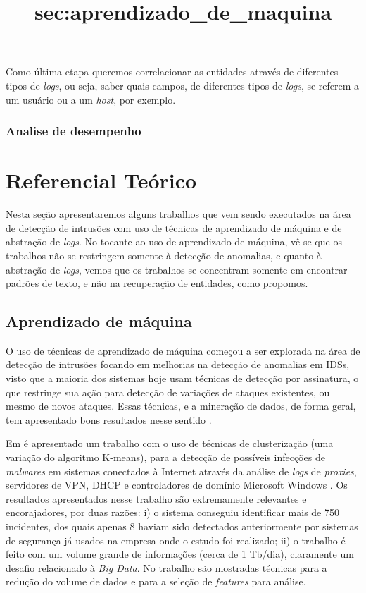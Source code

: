\documentclass[
	12pt,				%
	openright,			%
	twoside,			%
	a4paper,			%
	english,			%
	french,				%
	spanish,			%
	brazil,				%
	]{abntex2}
\begin{document}
Como última etapa queremos correlacionar as entidades através de diferentes tipos de \emph{logs}, ou seja, saber quais campos, de diferentes tipos de \emph{logs}, se referem a um usuário ou a um \emph{host}, por exemplo.

\subsection{Analise de desempenho}

\chapter{Referencial Teórico}\label{chap:referencial}

Nesta seção apresentaremos alguns trabalhos que vem sendo executados na área de detecção de intrusões com uso de técnicas de aprendizado de máquina e de abstração de \emph{logs}. No tocante ao uso de aprendizado de máquina, vê-se que os trabalhos não se restringem somente à detecção de anomalias, e quanto à abstração de \emph{logs}, vemos que os trabalhos se concentram somente em encontrar padrões de texto, e não na recuperação de entidades, como propomos.

\section{Aprendizado de máquina}\title{sec:aprendizado_de_maquina}
O uso de técnicas de aprendizado de máquina começou a ser explorada na área de detecção de intrusões focando em melhorias na detecção de anomalias em IDSs, visto que a maioria dos sistemas hoje usam técnicas de detecção por assinatura, o que restringe sua ação para detecção de variações de ataques existentes, ou mesmo de novos ataques. Essas técnicas, e a mineração de dados, de forma geral, tem apresentado bons resultados nesse sentido \cite{dua2011data, yen2013beehive, zomlot2013aiding, ganapathy2012intelligent, li2013automatic, joseph2012machine}.

Em \cite{yen2013beehive} é apresentado um trabalho com o uso de técnicas de clusterização (uma variação do algoritmo K-means\cite{ball1967clustering}), para a detecção de possíveis infecções de \emph{malwares} em sistemas conectados à Internet através da análise de \emph{logs} de \emph{proxies}, servidores de VPN, DHCP e controladores de domínio Microsoft Windows \texttrademark. Os resultados apresentados nesse trabalho são extremamente relevantes e encorajadores, por duas razões: i) o sistema conseguiu identificar mais de 750 incidentes, dos quais apenas 8 haviam sido detectados anteriormente por sistemas de segurança já usados na empresa onde o estudo foi realizado; ii) o trabalho é feito com um volume grande de informações (cerca de 1 Tb/dia), claramente um desafio relacionado à \emph{Big Data}. No trabalho são mostradas técnicas para a redução do volume de dados e para a seleção de \emph{features} para análise.
\end{document}
